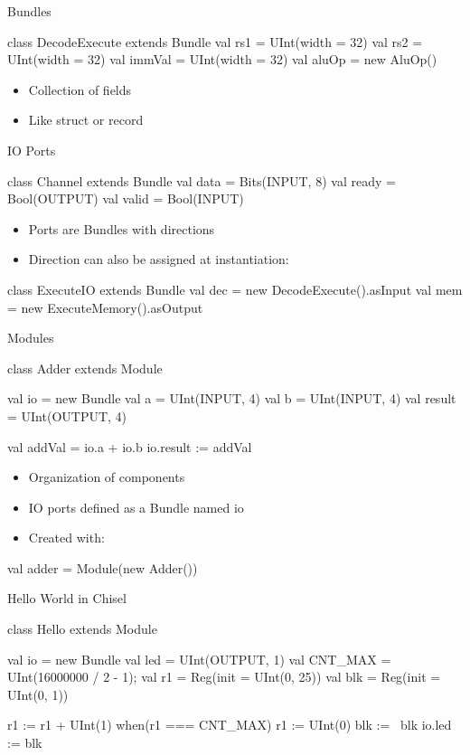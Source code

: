 \documentclass[xcolor=pdflatex,dvipsnames,table]{beamer}
\begin{document}
\begin{frame}[fragile]{Bundles}
\begin{chisel}
class DecodeExecute extends Bundle {
  val rs1 = UInt(width = 32)
  val rs2 = UInt(width = 32)
  val immVal = UInt(width = 32)
  val aluOp = new AluOp()
}
\end{chisel}
\begin{itemize}
\item Collection of fields 
\item Like struct or record
\end{itemize}
\end{frame}

\begin{frame}[fragile]{IO Ports}
\begin{chisel}
class Channel extends Bundle {
  val data = Bits(INPUT, 8)
  val ready = Bool(OUTPUT)
  val valid = Bool(INPUT)
}
\end{chisel}
\begin{itemize}
\item Ports are Bundles with directions
\item Direction can also be assigned at instantiation:
\end{itemize}
\begin{chisel}
class ExecuteIO extends Bundle {
  val dec = new DecodeExecute().asInput
  val mem = new ExecuteMemory().asOutput
}
\end{chisel}
\end{frame}

\begin{frame}[fragile]{Modules}
\begin{chisel}
class Adder extends Module {
  val io = new Bundle {
    val a = UInt(INPUT, 4)
    val b = UInt(INPUT, 4)
    val result = UInt(OUTPUT, 4)
  }

  val addVal = io.a + io.b
  io.result := addVal
}
\end{chisel}
\begin{itemize}
\item Organization of components
\item IO ports defined as a Bundle named io
\item Created with:
\end{itemize}
\begin{chisel}
val adder = Module(new Adder())
\end{chisel}
\end{frame}

\begin{frame}[fragile]{Hello World in Chisel}
\begin{chisel}
class Hello extends Module {
  val io = new Bundle {
    val led = UInt(OUTPUT, 1)
  }
  val CNT_MAX = UInt(16000000 / 2 - 1);
  val r1 = Reg(init = UInt(0, 25))
  val blk = Reg(init = UInt(0, 1))

  r1 := r1 + UInt(1)
  when(r1 === CNT_MAX) {
    r1 := UInt(0)
    blk := ~blk
  }
  io.led := blk
}
\end{chisel}
\end{frame}
\end{document}
